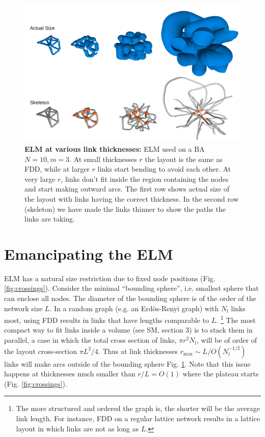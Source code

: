 \documentclass[nofootinbib,preprint,endfloats]{revtex4} %
\begin{document}
\begin{figure}
    \centering
    \includegraphics[width = .7\columnwidth]{fig-09-19/ELM.png}
    \caption{{\bf ELM at various link thicknesses:} ELM used on a BA $N=10, m=3$. At small thicknesses $r$ the layout is the same as FDD, while at larger $r$ links start bending to avoid each other. At very large $r$, links don't fit inside the region containing the nodes and start making outward arcs. The first row shows actual size of the layout with links having the correct thickness. In the second row (skeleton) we have made the links thinner to show the paths the links are taking. }
    \label{fig:ELM}
\end{figure}

\section{Emancipating the ELM}
ELM has a natural size restriction due to fixed node positions (Fig. \ref{fig:crossings}).
Consider the minimal ``bounding sphere'', i.e. smallest sphere that can enclose all nodes. 
The diameter of the bounding sphere is of the order of the network size $L$. 
In a random graph (e.g. an Erd\"os-Renyi graph) with $N_l$ links most, using FDD results in links that have lengths comparable to $L$.
\footnote{The more structured and ordered the graph is, the shorter will be the average link length. 
For instance, FDD on a regular lattice network results in a lattice layout in which links are not as long as $L$.} 
The most compact way to fit links inside a volume (see SM, section 3) is to stack them in parallel, a case in which the total cross section of links, $\pi r^2 N_l$, will be of order of the layout cross-section $\pi L^2/4$. 
Thus at link thicknesses $r_\mathrm{max} \sim L/O(N_l^{-1/2})$ links will make arcs outside of the bounding sphere %
Fig. \ref{fig:ELM}. Note that this issue happens at thicknesses much smaller than $r/L = O(1)$ where the plateau starts (Fig. \ref{fig:crossings}).  
\end{document}
